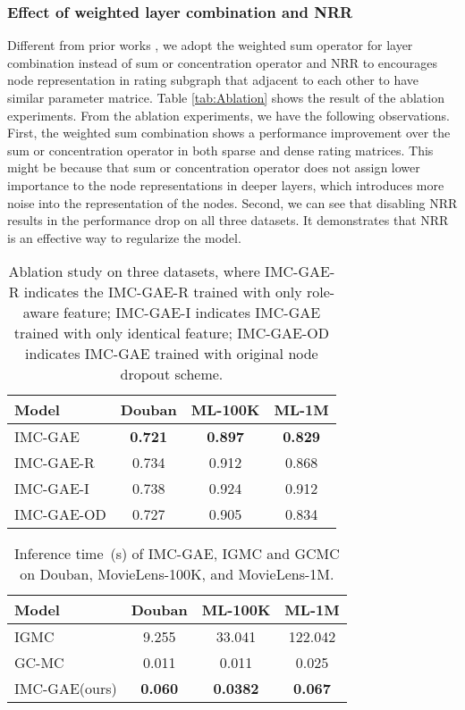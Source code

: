 \documentclass[sigconf]{acmart}
\begin{document}
\subsubsection{Effect of weighted layer combination and NRR} Different from prior works \cite{berg2017graph,zhang2019inductive}, we adopt the weighted sum operator for layer combination instead of sum or concentration operator and NRR to encourages node representation in rating subgraph that adjacent to each other to have similar parameter matrice. Table \ref{tab:Ablation} shows the result of the ablation experiments. From the ablation experiments, we have the following observations. First, the weighted sum combination shows a performance improvement over the sum or concentration operator in both sparse and dense rating matrices. This might be because that sum or concentration operator does not assign lower importance to the node representations in deeper layers, which introduces more noise into the representation of the nodes. Second, we can see that disabling NRR results in the performance drop on all three datasets. It demonstrates that NRR is an effective way to regularize the model.
\begin{table}
  \caption{Ablation study on three datasets, where IMC-GAE-R indicates the IMC-GAE-R trained with only role-aware feature; IMC-GAE-I indicates IMC-GAE trained with only identical feature; IMC-GAE-OD indicates IMC-GAE trained with original node dropout scheme.}
  \label{tab:structure_cmp}
  \begin{tabular}{lccc}
    \toprule
    \textbf{Model}&\textbf{Douban}&\textbf{ML-100K}&\textbf{ML-1M}\\
    \midrule
    IMC-GAE & \textbf{0.721} & \textbf{0.897} & \textbf{0.829}\\
    IMC-GAE-R & 0.734 & 0.912 & 0.868\\
    IMC-GAE-I & 0.738 & 0.924 & 0.912\\
    IMC-GAE-OD & 0.727 & 0.905 & 0.834 \\
  \bottomrule
\end{tabular}
\end{table}
\begin{table}
  \caption{Inference time~(s) of IMC-GAE, IGMC and GCMC on Douban, MovieLens-100K, and MovieLens-1M.}
  \label{tab:infer}
  \begin{tabular}{lccc}
    \toprule
    \textbf{Model}&\textbf{Douban}&\textbf{ML-100K}&\textbf{ML-1M}\\
    \midrule
    IGMC & 9.255 & 33.041 & 122.042\\
    GC-MC & 0.011 & 0.011 &  0.025\\
    IMC-GAE(ours) & \textbf{0.060} & \textbf{0.0382} & \textbf{0.067}\\
  \bottomrule
\end{tabular}
\end{table}
\end{document}
